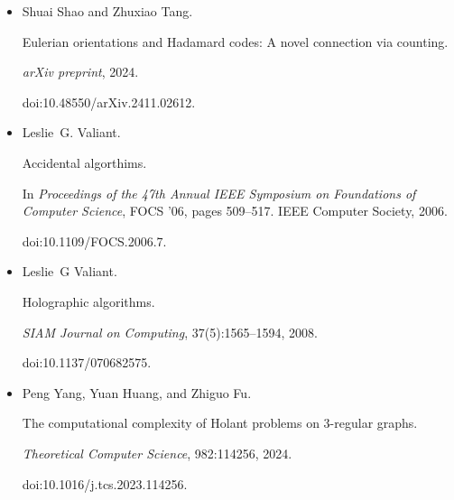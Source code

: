 \begin{itemize}
In \emph{2020 IEEE 61st Annual Symposium on Foundations of Computer
Science (FOCS)}, pages 1091–1102. IEEE, 2020.


doi:10.1109/FOCS46700.2020.00105.





\item[] 
[27]

Shuai Shao and Zhuxiao Tang.


Eulerian orientations and Hadamard codes: A novel connection via
counting.


\emph{arXiv preprint}, 2024.


doi:10.48550/arXiv.2411.02612.





\item[] 
[28]

Leslie G. Valiant.


Accidental algorthims.


In \emph{Proceedings of the 47th Annual IEEE Symposium on Foundations
of Computer Science}, FOCS ’06, pages 509–517. IEEE Computer Society, 2006.


doi:10.1109/FOCS.2006.7.





\item[] 
[29]

Leslie G Valiant.


Holographic algorithms.


\emph{SIAM Journal on Computing}, 37(5):1565–1594, 2008.


doi:10.1137/070682575.





\item[] 
[30]

Peng Yang, Yuan Huang, and Zhiguo Fu.


The computational complexity of Holant problems on 3-regular
graphs.


\emph{Theoretical Computer Science}, 982:114256, 2024.


doi:10.1016/j.tcs.2023.114256.





\end{itemize}

